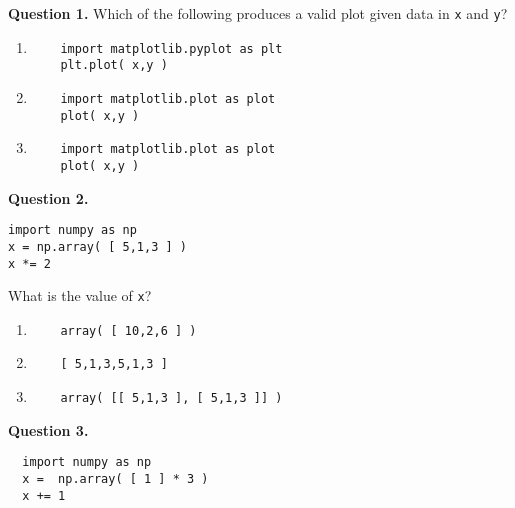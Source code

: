 \documentclass[12pt]{article}
\begin{document}
\bigskip

\bigskip

{\bf Question 1.}     
Which of the following produces a valid plot given data in \texttt{x} and \texttt{y}?

   \begin{enumerate}[label=\Alph*]
   	\item
   	\begin{Verbatim}
	import matplotlib.pyplot as plt
	plt.plot( x,y )
   	\end{Verbatim}
   	\item
   	\begin{Verbatim}
	import matplotlib.plot as plot
	plot( x,y )
   	\end{Verbatim}
   	\item
   	\begin{Verbatim}
	import matplotlib.plot as plot
	plot( x,y )
   	\end{Verbatim}
   \end{enumerate}

\bigskip

{\bf Question 2.}     \begin{Verbatim}
import numpy as np
x = np.array( [ 5,1,3 ] )
x *= 2
\end{Verbatim}

What is the value of \texttt{x}?

\begin{enumerate}[label=\Alph*]
	\item
	\begin{Verbatim}
	array( [ 10,2,6 ] )
	\end{Verbatim}
	\item
	\begin{Verbatim}
	[ 5,1,3,5,1,3 ]
	\end{Verbatim}
	\item
	\begin{Verbatim}
	array( [[ 5,1,3 ], [ 5,1,3 ]] )
	\end{Verbatim}
\end{enumerate}

\bigskip

{\bf Question 3.} 
  \begin{Verbatim}
  import numpy as np
  x =  np.array( [ 1 ] * 3 )
  x += 1
  \end{Verbatim}
  
\end{document}
